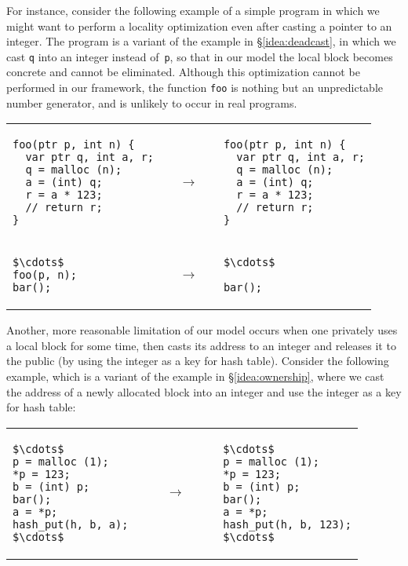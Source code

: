 For instance, consider the following example of a simple program in which we might want to perform a locality optimization even after casting a pointer to an integer.
The program is a variant of 
the example in \S\ref{idea:deadcast}, in which we cast \texttt{q} into an integer instead of~\texttt{p},
so that in our model the local block becomes concrete and cannot be eliminated.
Although this optimization cannot be performed in our framework, the function \texttt{foo} is nothing but an %
unpredictable number generator, and is unlikely to occur in real programs.

\begin{center}
\begin{tabular}{@{}l@{}l@{}l@{}}
\begin{lstlisting}
foo(ptr p, int n) {
  var ptr q, int a, r;
  q = malloc (n);
  a = (int) q;
  r = a * 123;
  // return r;
}
\end{lstlisting}
&
$\quad\rightarrow\quad$
&
\begin{lstlisting}
foo(ptr p, int n) {
  var ptr q, int a, r;
  q = malloc (n);
  a = (int) q;
  r = a * 123;
  // return r;
}
\end{lstlisting}
\\
\begin{lstlisting}
$\cdots$
foo(p, n);
bar();
\end{lstlisting}
&
$\quad\rightarrow\quad$
&
\begin{lstlisting}
$\cdots$

bar();
\end{lstlisting}
\end{tabular}
\end{center}

Another, more reasonable limitation of our model occurs when one privately uses a local block for some time, then casts its address to an integer and releases it to the
public (\eg by using the integer as a key for hash table).  Consider the following example, which is a variant of the example in \S\ref{idea:ownership},
where we cast the address of a newly allocated block into an integer
and use the integer as a key for hash table:
\begin{center}
\begin{tabular}{@{}l@{}l@{}l@{}}
\begin{lstlisting}
$\cdots$
p = malloc (1);
*p = 123;
b = (int) p;
bar();
a = *p;
hash_put(h, b, a);
$\cdots$
\end{lstlisting}
&
$\qquad\rightarrow\qquad$
&
\begin{lstlisting}
$\cdots$
p = malloc (1);
*p = 123;
b = (int) p;
bar();
a = *p;
hash_put(h, b, 123);
$\cdots$
\end{lstlisting}
\end{tabular}
\end{center}

